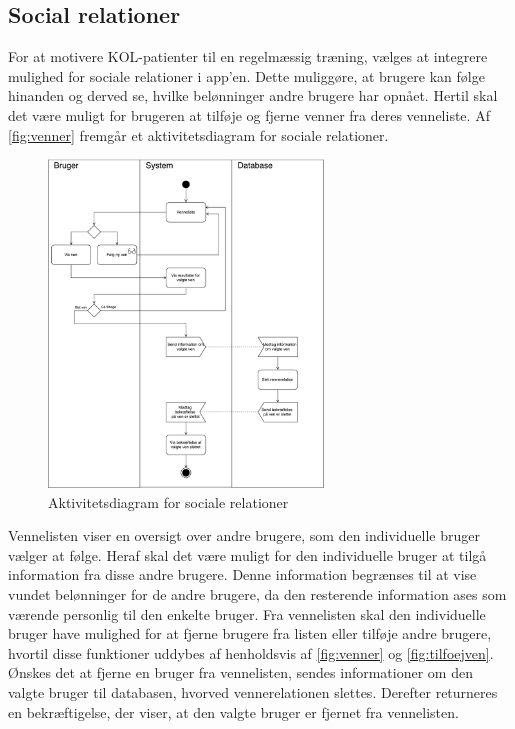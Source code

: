 \subsection{Social relationer} 
For at motivere KOL-patienter til en regelmæssig træning, vælges at integrere mulighed for sociale relationer i app'en. Dette muliggøre, at brugere kan følge hinanden og derved se, hvilke belønninger andre brugere har opnået. Hertil skal det være muligt for brugeren at tilføje og fjerne venner fra deres venneliste. 
Af \autoref{fig:venner} fremgår et aktivitetsdiagram for sociale relationer. 

\begin{figure} [H]
\centering
\includegraphics[width=0.65\textwidth]{figures/aktivitetsdiagram/venner}
\caption{Aktivitetsdiagram for sociale relationer}
\label{fig:venner}
\end{figure}

\noindent
Vennelisten viser en oversigt over andre brugere, som den individuelle bruger vælger at følge. Heraf skal det være muligt for den individuelle bruger at tilgå information fra disse andre brugere. Denne information begrænses til at vise vundet belønninger for de andre brugere, da den resterende information ases som værende personlig til den enkelte bruger. 
Fra vennelisten skal den individuelle bruger have mulighed for at fjerne brugere fra listen eller tilføje andre brugere, hvortil disse funktioner uddybes af henholdsvis af \autoref{fig:venner} og \autoref{fig:tilfoejven}.  
Ønskes det at fjerne en bruger fra vennelisten, sendes informationer om den valgte bruger til databasen, hvorved vennerelationen slettes. Derefter returneres en bekræftigelse, der viser, at den valgte bruger er fjernet fra vennelisten. 

